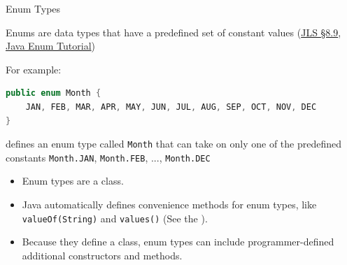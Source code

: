 \documentclass{beamer}
\begin{document}
\begin{frame}[fragile]{Enum Types}

Enums are data types that have a predefined set of constant values (\href{http://docs.oracle.com/javase/specs/jls/se7/html/jls-8.html#jls-8.9}{JLS \S 8.9}, \href{http://docs.oracle.com/javase/tutorial/java/javaOO/enum.html}{Java Enum Tutorial})

For example:
\begin{lstlisting}[language=Java]
public enum Month {
    JAN, FEB, MAR, APR, MAY, JUN, JUL, AUG, SEP, OCT, NOV, DEC
}
\end{lstlisting}
defines an enum type called {\tt Month} that can take on only one of the predefined constants {\tt Month.JAN}, {\tt Month.FEB}, ..., {\tt Month.DEC}

\begin{itemize}
\item Enum types are a class.
\item Java automatically defines convenience methods for enum types, like {\tt valueOf(String)} and {\tt values()} (See the ).
\item Because they define a class, enum types can include programmer-defined additional constructors and methods.
\end{itemize}

\end{frame}
\end{document}
